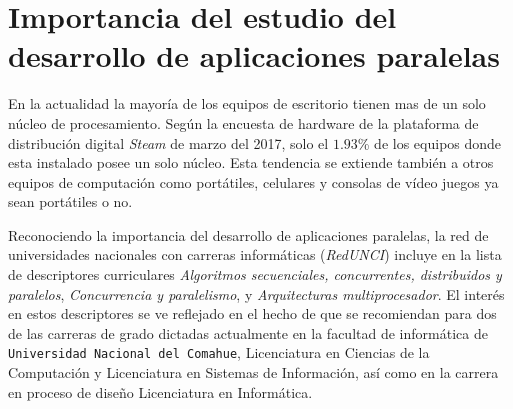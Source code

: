 
\section{Importancia del estudio del desarrollo de aplicaciones paralelas}

En la actualidad la mayoría de los equipos de escritorio tienen mas de un solo
núcleo de procesamiento. Según la encuesta de hardware de la plataforma de
distribución digital \emph{Steam} de marzo del 2017, solo el $1.93$\% de los
equipos donde esta instalado posee un solo núcleo. Esta tendencia se extiende
también a otros equipos de computación como portátiles, celulares y consolas
de vídeo juegos ya sean portátiles o no.

Reconociendo la importancia del desarrollo de aplicaciones paralelas, la red
de universidades nacionales con carreras informáticas (\emph{RedUNCI}) incluye
en la lista de descriptores curriculares \emph{Algoritmos secuenciales,
concurrentes, distribuidos y paralelos}, \emph{Concurrencia y paralelismo}, y
\emph{Arquitecturas multiprocesador}. El interés en estos descriptores se ve
reflejado en el hecho de que se recomiendan para dos de las carreras de grado
dictadas actualmente en la facultad de informática de \texttt{Universidad
Nacional del Comahue}, Licenciatura en Ciencias de la Computación y
Licenciatura en Sistemas de Información, así como en la carrera en proceso de
diseño Licenciatura en Informática.
